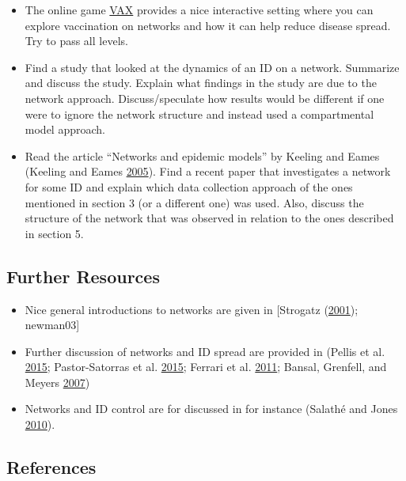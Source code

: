 \documentclass[]{article}
\providecommand{\tightlist}{%
  \setlength{\itemsep}{0pt}\setlength{\parskip}{0pt}}
\theoremstyle{definition}
\theoremstyle{definition}
\theoremstyle{definition}
\theoremstyle{remark}
\begin{document}
\begin{itemize}
\tightlist
\item
  The online game \href{http://vax.herokuapp.com/}{VAX} provides a nice
  interactive setting where you can explore vaccination on networks and
  how it can help reduce disease spread. Try to pass all levels.
\item
  Find a study that looked at the dynamics of an ID on a network.
  Summarize and discuss the study. Explain what findings in the study
  are due to the network approach. Discuss/speculate how results would
  be different if one were to ignore the network structure and instead
  used a compartmental model approach.
\item
  Read the article ``Networks and epidemic models'' by Keeling and Eames
  (Keeling and Eames \protect\hyperlink{ref-keeling05}{2005}). Find a
  recent paper that investigates a network for some ID and explain which
  data collection approach of the ones mentioned in section 3 (or a
  different one) was used. Also, discuss the structure of the network
  that was observed in relation to the ones described in section 5.
\end{itemize}

\subsection{Further Resources}\label{further-resources-13}

\begin{itemize}
\tightlist
\item
  Nice general introductions to networks are given in {[}Strogatz
  (\protect\hyperlink{ref-strogatz01}{2001}); newman03{]}
\item
  Further discussion of networks and ID spread are provided in (Pellis
  et al. \protect\hyperlink{ref-pellis15}{2015}; Pastor-Satorras et al.
  \protect\hyperlink{ref-pastor-satorras15}{2015}; Ferrari et al.
  \protect\hyperlink{ref-ferrari11}{2011}; Bansal, Grenfell, and Meyers
  \protect\hyperlink{ref-bansal07}{2007})
\item
  Networks and ID control are for discussed in for instance (Salathé and
  Jones \protect\hyperlink{ref-salathe10}{2010}).
\end{itemize}

\subsection{References}\label{references-14}
\end{document}
